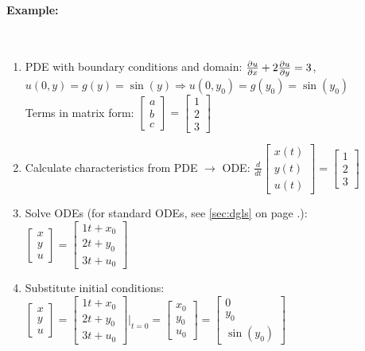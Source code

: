 \paragraph{Example:}~\\
\begin{enumerate}
	\item PDE with boundary conditions and domain: $\frac{\partial u}{\partial x}+2\frac{\partial u}{\partial y}=3$, \; $u(0,y)=g(y)=\sin(y) \Rightarrow u(0,y_0) = g(y_0) = \sin(y_0)$\\
	Terms in matrix form: $\begin{bmatrix}a\\b\\c\end{bmatrix}=\begin{bmatrix}1\\2\\3\end{bmatrix}$
	\item Calculate characteristics from PDE $\rightarrow$ ODE: 	$\frac {d}{dt}\begin{bmatrix}x(t)\\y(t)\\u(t)\end{bmatrix}=\begin{bmatrix}1\\2\\3\end{bmatrix}$
	\item Solve ODEs (for standard ODEs, see \ref{sec:dgls} on page \pageref{sec:dgls}.):
	$\begin{bmatrix}x\\y\\u\end{bmatrix}=\begin{bmatrix}1t+x_0\\2t+y_0\\3t+u_0\end{bmatrix}$
	\item Substitute initial conditions: $\begin{bmatrix}x\\y\\u\end{bmatrix}=\begin{bmatrix}1t+x_0\\2t+y_0\\3t+u_0\end{bmatrix}\Bigg|_{t=0}=
	\begin{bmatrix}x_0\\y_0\\u_0\end{bmatrix}=\begin{bmatrix}0\\y_0\\\sin(y_0)\end{bmatrix}$\\

\end{enumerate}

